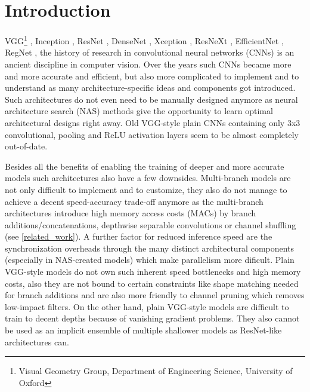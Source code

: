 \section{Introduction} \label{introduction}

VGG\footnote{Visual Geometry Group, Department of Engineering Science, University of Oxford} \cite{KarenSimonyan.2014}, Inception \cite{ChristianSzegedy.2014}, ResNet \cite{KaimingHe.2015}, DenseNet \cite{GaoHuang.2016}, Xception \cite{FrancoisChollet.2017}, ResNeXt \cite{SainingXie.2017}, EfficientNet \cite{LeMingxingTan.2019}, RegNet \cite{IlijaRadosavovic.2020}, the history of research in convolutional neural networks (CNNs) is an ancient discipline in computer vision. Over the years such CNNs became more and more accurate and efficient, but also more complicated to implement and to understand as many architecture-specific ideas and components got introduced. Such architectures do not even need to be manually designed anymore as neural architecture search (NAS) methods give the opportunity to learn optimal architectural designs right away. Old VGG-style plain CNNs containing only 3x3 convolutional, pooling and ReLU activation layers seem to be almost completely out-of-date. 

Besides all the benefits of enabling the training of deeper and more accurate models such architectures also have a few downsides. Multi-branch models are not only difficult to implement and to customize, they also do not manage to achieve a decent speed-accuracy trade-off anymore as the multi-branch architectures introduce high memory access costs (MACs) by branch additions/concatenations, depthwise separable convolutions or channel shuffling (see \autoref{related_work}). A further factor for reduced inference speed are the synchronization overheads through the many distinct architectural components (especially in NAS-created models) which make parallelism more dificult. Plain VGG-style models do not own such inherent speed bottlenecks and high memory costs, also they are not bound to certain constraints like shape matching needed for branch additions and are also more friendly to channel pruning \cite{HaoLi.2017} which removes low-impact filters. On the other hand, plain VGG-style models are difficult to train to decent depths because of vanishing gradient problems. They also cannot be used as an implicit ensemble of multiple shallower models as ResNet-like architectures can. 

